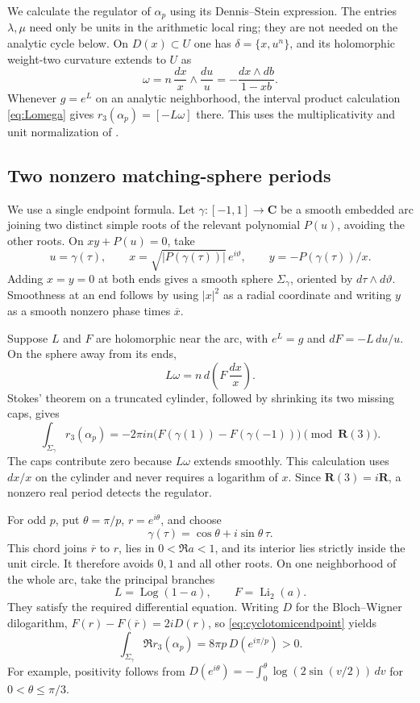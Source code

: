 \documentclass[11pt,a4paper]{article}
\theoremstyle{remark}
\newcommand{\R}{\mathbf R}
\newcommand{\C}{\mathbf C}
\begin{document}
We calculate the regulator of $\alpha_p$ using its Dennis--Stein expression.
The entries $\lambda,\mu$ need only be units in the arithmetic local ring;
they are not needed on the analytic cycle below.
On $D(x)\subset U$ one has $\delta=\{x,u^n\}$, and its holomorphic
weight-two curvature extends to $U$ as
\[
 \omega=n\,\frac{dx}{x}\wedge\frac{du}{u}
        =-\frac{dx\wedge db}{1-xb}.
\]
Whenever $g=e^L$ on an analytic neighborhood, the interval product
calculation \eqref{eq:Lomega} gives
$r_3(\alpha_p)=[-L\omega]$ there.
This uses the multiplicativity and unit normalization of
\cite[Proposition~2.8, Theorem~2.31 and Lemma~4.5]{BunkeTamme}.

\subsection{Two nonzero matching-sphere periods}

We use a single endpoint formula. Let $\gamma:[-1,1]\to\C$ be a smooth
embedded arc joining two distinct simple roots of the relevant polynomial
$P(u)$, avoiding the other roots. On $xy+P(u)=0$, take
\[
 u=\gamma(\tau),\qquad
 x=\sqrt{|P(\gamma(\tau))|}\,e^{i\vartheta},\qquad
 y=-P(\gamma(\tau))/x.
\]
Adding $x=y=0$ at both ends gives a smooth sphere $\Sigma_\gamma$,
oriented by $d\tau\wedge d\vartheta$. Smoothness at an end follows by
using $|x|^2$ as a radial coordinate and writing $y$ as a smooth
nonzero phase times $\overline x$.

Suppose $L$ and $F$ are holomorphic near the arc, with
$e^L=g$ and $dF=-L\,du/u$. On the sphere away from its ends,
\[
 L\omega=n\,d\left(F\,\frac{dx}{x}\right).
\]
Stokes' theorem on a truncated cylinder, followed by shrinking its
two missing caps, gives
\begin{equation}\label{eq:cyclotomicendpoint}
 \int_{\Sigma_\gamma}r_3(\alpha_p)
 =-2\pi i n\bigl(F(\gamma(1))-F(\gamma(-1))\bigr)
 \pmod{\R(3)}.
\end{equation}
The caps contribute zero because $L\omega$ extends smoothly.
This calculation uses $dx/x$ on the cylinder and never requires a
logarithm of $x$. Since $\R(3)=i\R$, a nonzero real period detects
the regulator.

For odd $p$, put $\theta=\pi/p$, $r=e^{i\theta}$, and choose
\[
 \gamma(\tau)=\cos\theta+i\sin\theta\,\tau .
\]
This chord joins $\overline r$ to $r$, lies in $0<\Re a<1$, and its
interior lies strictly inside the unit circle. It therefore avoids
$0,1$ and all other roots. On one neighborhood of the whole arc,
take the principal branches
\[
 L=\operatorname{Log}(1-a),\qquad F=\operatorname{Li}_2(a).
\]
They satisfy the required differential equation.
Writing $D$ for the Bloch--Wigner dilogarithm,
$F(r)-F(\overline r)=2iD(r)$, so \eqref{eq:cyclotomicendpoint} yields
\begin{equation}\label{eq:oddcyclotomicperiod}
 \int_{\Sigma_\gamma}\Re r_3(\alpha_p)
 =8\pi p\,D(e^{i\pi/p})>0.
\end{equation}
For example, positivity follows from
$D(e^{i\theta})=-\int_0^\theta\log(2\sin(v/2))\,dv$
for $0<\theta\leq\pi/3$.
\end{document}
